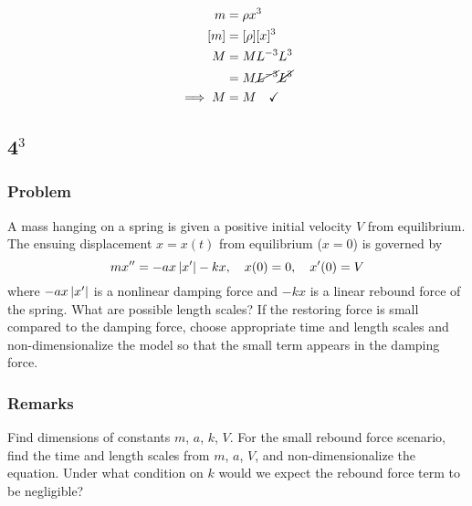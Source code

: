 \documentclass[12pt]{article}
\begin{document}
\begin{equation}
  \begin{aligned}
    m &= \rho x^3 \\
    [m] &= [\rho] [x]^3 \\
    M &= ML^{-3} L^{3} \\
    &= M\cancel{L^{-3}} \cancel{L^{3}} \\
    \implies M &= M \quad\checkmark
  \end{aligned}
\end{equation}

\subsection{4$^3$}
\subsubsection*{Problem}
A mass hanging on a spring is given a positive initial velocity $V$ from
equilibrium. The ensuing displacement $x=x(t)$ from equilibrium ($x=0$) is
governed by
\begin{equation}
  \label{eq:4-problem}
  mx'' = -ax\left|{x'}\right|-kx, \quad x(0) = 0,\quad x'(0) = V
\end{equation}
where
$-ax\left|{x'}\right|$ is a nonlinear damping force and $-kx$ is a linear rebound force
of the spring. What are possible length scales? If the restoring force is small
compared to the damping force, choose appropriate time and length scales and
non-dimensionalize the model so that the small term appears in the damping
force.

\subsubsection*{Remarks}
Find dimensions of constants $m$, $a$, $k$, $V$. For the small rebound force
scenario, find the time and length scales from $m$, $a$, $V$, and
non-dimensionalize the equation. Under what condition on $k$ would we expect the
rebound force term to be negligible?
\end{document}
